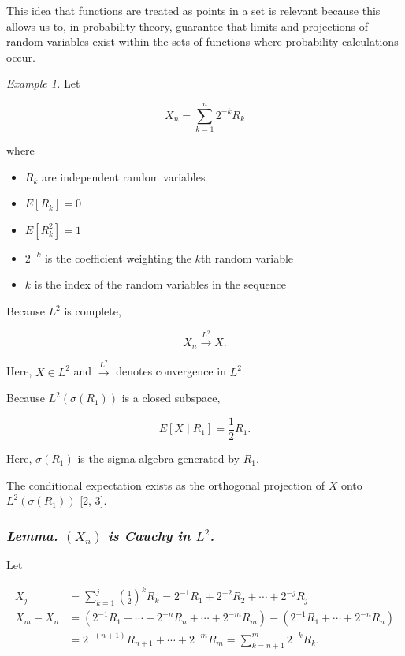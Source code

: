 \documentclass{article}
\newenvironment{mdblock}{%
  \par\addvspace{1.5\baselineskip}%
  \noindent\ignorespaces
}{%
  \par\addvspace{1.5\baselineskip}%
}
\begin{document}
This idea that functions are treated as points in a set is relevant because this allows us to, in probability theory, guarantee that limits and projections of random variables exist within the sets of functions where probability calculations occur.

\begin{mdblock}
\emph{Example 1.} Let

$$
X_n=\sum_{k=1}^{n}2^{-k}R_k
$$

where

\begin{itemize}
    \item $R_k$ are independent random variables
    \item $E[R_k]=0$
    \item $E[R_k^2]=1$
    \item $2^{-k}$ is the coefficient weighting the $k$th random variable
    \item $k$ is the index of the random variables in the sequence
\end{itemize}

Because $L^2$ is complete,

$$
X_n\xrightarrow{L^2}X.
$$

Here, $X\in L^2$ and $\xrightarrow{L^2}$ denotes convergence in $L^2$.

Because $L^2(\sigma(R_1))$ is a closed subspace,

$$
E[X\mid R_1] = \frac12R_1.
$$

Here, $\sigma(R_1)$ is the sigma-algebra generated by $R_1$.

The conditional expectation exists as the orthogonal projection of $X$ onto $L^2(\sigma(R_1))$ [2, 3].
\end{mdblock}
\subsubsection{\emph{Lemma. $(X_n)$ is Cauchy in $L^2$.}}

Let

$$
\begin{aligned} X_j &= \sum_{k=1}^{j}\left(\frac12\right)^kR_k = 2^{-1}R_1+2^{-2}R_2+\cdots+2^{-j}R_j \\[0.5em] X_m-X_n &= \left(2^{-1}R_1+\cdots+2^{-n}R_n+\cdots+2^{-m}R_m\right) -\left(2^{-1}R_1+\cdots+2^{-n}R_n\right) \\ &= 2^{-(n+1)}R_{n+1}+\cdots+2^{-m}R_m = \sum_{k=n+1}^{m}2^{-k}R_k. \end{aligned}
$$
\end{document}
